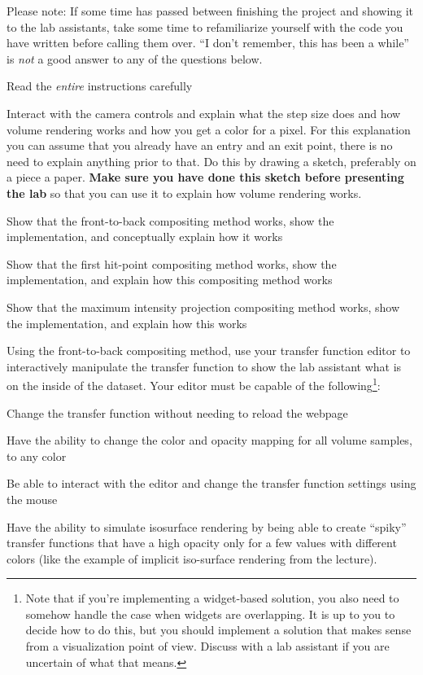 \documentclass{labinstructions}
\begin{document}
Please note: If some time has passed between finishing the project and showing it to the lab assistants, take some time to refamiliarize yourself with the code you have written before calling them over.  ``I don't remember, this has been a while'' is \emph{not} a good answer to any of the questions below.
\begin{todolist}
  \item Read the \emph{entire} instructions carefully
  \item Interact with the camera controls and explain what the step size does and how volume rendering works and how you get a color for a pixel.  For this explanation you can assume that you already have an entry and an exit point, there is no need to explain anything prior to that.  Do this by drawing a sketch, preferably on a piece a paper. \textbf{Make sure you have done this sketch before presenting the lab} so that you can use it to explain how volume rendering works.
  \item Show that the front-to-back compositing method works, show the implementation, and conceptually explain how it works
  \item Show that the first hit-point compositing method works, show the implementation, and explain how this compositing method works
  \item Show that the maximum intensity projection compositing method works, show the implementation, and explain how this works
  \item Using the front-to-back compositing method, use your transfer function editor to interactively manipulate the transfer function to show the lab assistant what is on the inside of the dataset.
Your editor must be capable of the following\footnote{Note that if you're implementing a widget-based solution, you also need to somehow handle the case when widgets are overlapping. It is up to you to decide how to do this, but you should implement a solution that makes sense from a visualization point of view. Discuss with a lab assistant if you are uncertain of what that means. }:
  \begin{todolist}
    \item Change the transfer function without needing to reload the webpage
    \item Have the ability to change the color and opacity mapping for all volume samples, to any color
    \item Be able to interact with the editor and change the transfer function settings using the mouse
    \item Have the ability to simulate isosurface rendering by being able to create ``spiky'' transfer functions that have a high opacity only for a few values with different colors (like the example of implicit iso-surface rendering from the lecture).

\end{todolist}
\end{todolist}
\end{document}

